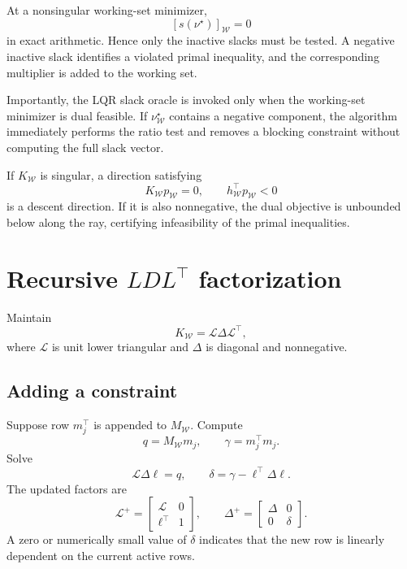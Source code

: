 \documentclass[11pt]{article}
\begin{document}
At a nonsingular working-set minimizer,
\[
[s(\nu^\star)]_{\mathcal W}=0
\]
in exact arithmetic. Hence only the inactive slacks must be tested.
A negative inactive slack identifies a violated primal inequality,
and the corresponding multiplier is added to the working set.

Importantly, the LQR slack oracle is invoked only when the
working-set minimizer is dual feasible. If
\(\nu_{\mathcal W}^\star\) contains a negative component, the
algorithm immediately performs the ratio test and removes a blocking
constraint without computing the full slack vector.

If \(K_{\mathcal W}\) is singular, a direction satisfying
\[
K_{\mathcal W}p_{\mathcal W}=0,\qquad
h_{\mathcal W}^\top p_{\mathcal W}<0
\]
is a descent direction. If it is also nonnegative, the dual objective
is unbounded below along the ray, certifying infeasibility of the
primal inequalities.

\section{Recursive \(LDL^\top\) factorization}

Maintain
\begin{equation}
K_{\mathcal W}
=
\mathscr L\Delta\mathscr L^\top,
\label{eq:ldl}
\end{equation}
where \(\mathscr L\) is unit lower triangular and \(\Delta\) is
diagonal and nonnegative.

\subsection{Adding a constraint}

Suppose row \(m_j^\top\) is appended to \(M_{\mathcal W}\). Compute
\[
q=M_{\mathcal W}m_j,\qquad
\gamma=m_j^\top m_j.
\]
Solve
\begin{equation}
\mathscr L\Delta\ell=q,
\qquad
\delta=\gamma-\ell^\top\Delta\ell.
\label{eq:ldl-addition}
\end{equation}
The updated factors are
\begin{equation}
\mathscr L^+
=
\begin{bmatrix}
\mathscr L&0\\
\ell^\top&1
\end{bmatrix},
\qquad
\Delta^+
=
\begin{bmatrix}
\Delta&0\\
0&\delta
\end{bmatrix}.
\label{eq:ldl-addition-factors}
\end{equation}
A zero or numerically small value of \(\delta\) indicates that the
new row is linearly dependent on the current active rows.
\end{document}
